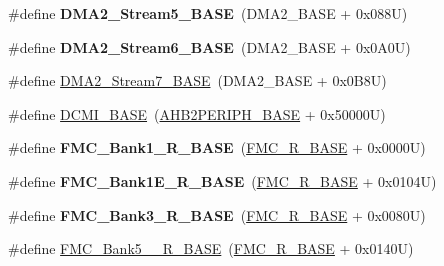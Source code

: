 \begin{DoxyCompactItemize}
\mbox{\label{group___peripheral__memory__map_gaed1460fdc407b6decfbffccb0260d0af}} 
\#define {\bfseries D\+M\+A2\+\_\+\+Stream5\+\_\+\+B\+A\+SE}~(D\+M\+A2\+\_\+\+B\+A\+SE + 0x088\+U)
\item 
\mbox{\label{group___peripheral__memory__map_ga5e81174c96fd204fa7c82c815e85c8e6}} 
\#define {\bfseries D\+M\+A2\+\_\+\+Stream6\+\_\+\+B\+A\+SE}~(D\+M\+A2\+\_\+\+B\+A\+SE + 0x0\+A0\+U)
\item 
\#define \mbox{\hyperlink{group___peripheral__memory__map_gaa9faa708ad2440d24eb1064cba9bb06d}{D\+M\+A2\+\_\+\+Stream7\+\_\+\+B\+A\+SE}}~(D\+M\+A2\+\_\+\+B\+A\+SE + 0x0\+B8\+U)
\item 
\#define \mbox{\hyperlink{group___peripheral__memory__map_ga55b794507e021135486de57129a2505c}{D\+C\+M\+I\+\_\+\+B\+A\+SE}}~(\mbox{\hyperlink{group___peripheral__memory__map_gaeedaa71d22a1948492365e2cd26cfd46}{A\+H\+B2\+P\+E\+R\+I\+P\+H\+\_\+\+B\+A\+SE}} + 0x50000\+U)
\item 
\mbox{\label{group___peripheral__memory__map_ga1d581e6f64ed2e5d97c11c58285a21b6}} 
\#define {\bfseries F\+M\+C\+\_\+\+Bank1\+\_\+\+R\+\_\+\+B\+A\+SE}~(\mbox{\hyperlink{group___peripheral__memory__map_ga7a599164cd92798542bc6288793d1ed5}{F\+M\+C\+\_\+\+R\+\_\+\+B\+A\+SE}} + 0x0000\+U)
\item 
\mbox{\label{group___peripheral__memory__map_gad82d3a6bac014fa645fb67a63fae4bc0}} 
\#define {\bfseries F\+M\+C\+\_\+\+Bank1\+E\+\_\+\+R\+\_\+\+B\+A\+SE}~(\mbox{\hyperlink{group___peripheral__memory__map_ga7a599164cd92798542bc6288793d1ed5}{F\+M\+C\+\_\+\+R\+\_\+\+B\+A\+SE}} + 0x0104\+U)
\item 
\mbox{\label{group___peripheral__memory__map_gaf570671195a13f4bb2a1b8f2bd5305c9}} 
\#define {\bfseries F\+M\+C\+\_\+\+Bank3\+\_\+\+R\+\_\+\+B\+A\+SE}~(\mbox{\hyperlink{group___peripheral__memory__map_ga7a599164cd92798542bc6288793d1ed5}{F\+M\+C\+\_\+\+R\+\_\+\+B\+A\+SE}} + 0x0080\+U)
\item 
\#define \mbox{\hyperlink{group___peripheral__memory__map_gace117149a4fc0d07c38cc997fe4c4a73}{F\+M\+C\+\_\+\+Bank5\+\_\+\_\+\+R\+\_\+\+B\+A\+SE}}~(\mbox{\hyperlink{group___peripheral__memory__map_ga7a599164cd92798542bc6288793d1ed5}{F\+M\+C\+\_\+\+R\+\_\+\+B\+A\+SE}} + 0x0140\+U)

\end{DoxyCompactItemize}
